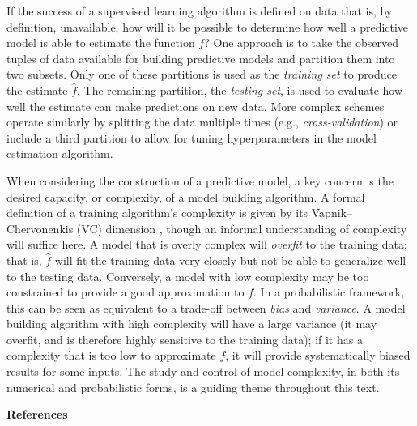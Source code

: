\documentclass[12pt,hidelinks]{article}
\numberwithin{equation}{section}
\begin{document}
If the success of a supervised learning algorithm is defined on data that is,
by definition, unavailable, how will it be possible to determine how well a
predictive model is able to estimate the function $f$? One approach is to take
the observed tuples of data available for building predictive models and
partition them into two subsets. Only one of these partitions is used as the
\textit{training set} to produce the estimate $\widehat{f}$. The remaining
partition, the \textit{testing set}, is used to evaluate how well the estimate
can make predictions on new data. More complex schemes operate similarly by
splitting the data multiple times (e.g., \textit{cross-validation}) or
include a third partition to allow for tuning hyperparameters in the model
estimation algorithm.

When considering the construction of a predictive model, a key concern is the
desired capacity, or complexity, of a model building
algorithm. A formal definition
of a training algorithm's complexity is given by its Vapnik--Chervonenkis (VC)
dimension \cite{vapnik1971uniform}, though an informal understanding of
complexity will suffice here. A model that is overly complex will
\textit{overfit} to the training data; that is, $\widehat{f}$ will fit the
training data very closely but not be able to generalize well to the testing
data. Conversely, a model with low complexity may be too constrained to
provide a good approximation to $f$. In a probabilistic framework, this can
be seen as equivalent to a trade-off between \textit{bias} and
\textit{variance}. A model building algorithm with high complexity will have
a large variance (it may overfit, and is therefore highly sensitive to the
training data); if it has a complexity that is too low to approximate $f$, it
will provide systematically biased results for some inputs. The study and
control of model complexity, in both its numerical and probabilistic forms,
is a guiding theme throughout this text.

\renewcommand{\section}[2]{}%
\vspace{12pt}
\textbf{References}

\end{document}
